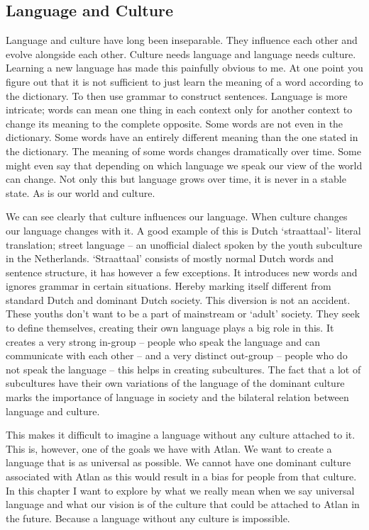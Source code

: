 \subsection{Language and Culture}

\noindent Language and culture have long been inseparable. They influence each other and evolve alongside each other. Culture needs language and language needs culture. Learning a new language has made this painfully obvious to me. At one point you figure out that it is not sufficient to just learn the meaning of a word according to the dictionary. To then use grammar to construct sentences. Language is more intricate; words can mean one thing in each context only for another context to change its meaning to the complete opposite. Some words are not even in the dictionary. Some words have an entirely different meaning than the one stated in the dictionary. The meaning of some words changes dramatically over time. Some might even say that depending on which language we speak our view of the world can change. Not only this but language grows over time, it is never in a stable state. As is our world and culture.  

We can see clearly that culture influences our language. When culture changes our language changes with it. A good example of this is Dutch ‘straattaal’- literal translation; street language – an unofficial dialect spoken by the youth subculture in the Netherlands. ‘Straattaal’ consists of mostly normal Dutch words and sentence structure, it has however a few exceptions. It introduces new words and ignores grammar in certain situations. Hereby marking itself different from standard Dutch and dominant Dutch society. This diversion is not an accident. These youths don’t want to be a part of mainstream or ‘adult’ society. They seek to define themselves, creating their own language plays a big role in this. It creates a very strong in-group – people who speak the language and can communicate with each other – and a very distinct out-group – people who do not speak the language – this helps in creating subcultures. The fact that a lot of subcultures have their own variations of the language of the dominant culture marks the importance of language in society and the bilateral relation between language and culture.  

This makes it difficult to imagine a language without any culture attached to it. This is, however, one of the goals we have with Atlan. We want to create a language that is as universal as possible. We cannot have one dominant culture associated with Atlan as this would result in a bias for people from that culture. In this chapter I want to explore by what we really mean when we say universal language and what our vision is of the culture that could be attached to Atlan in the future. Because a language without any culture is impossible.  

